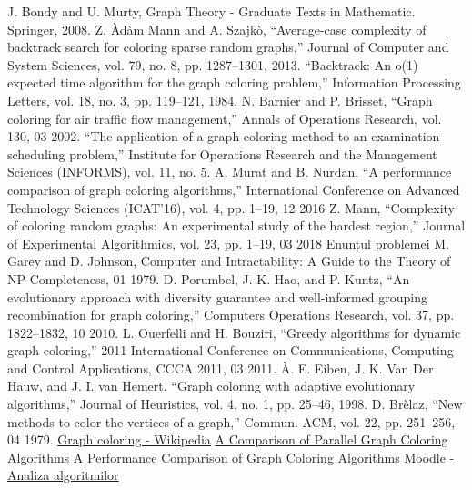 \documentclass[runningheads]{llncs}
\begin{document}
\begin{thebibliography}{8}
J. Bondy and U. Murty, Graph Theory - Graduate Texts in Mathematic.
Springer, 2008.
Z. \`{A}d\`{a}m Mann and A. Szajk\`{o}, “Average-case complexity of backtrack
search for coloring sparse random graphs,” Journal of Computer and
System Sciences, vol. 79, no. 8, pp. 1287–1301, 2013.
“Backtrack: An o(1) expected time algorithm for the graph coloring
problem,” Information Processing Letters, vol. 18, no. 3, pp. 119–121,
1984.
N. Barnier and P. Brisset, “Graph coloring for air traffic flow management,” 
Annals of Operations Research, vol. 130, 03 2002.
“The application of a graph coloring method to an examination scheduling problem,” 
Institute for Operations Research and the Management
Sciences (INFORMS), vol. 11, no. 5.
A. Murat and B. Nurdan, “A performance comparison of graph coloring algorithms,” 
International Conference on Advanced Technology
Sciences (ICAT’16), vol. 4, pp. 1–19, 12 2016
Z. Mann, “Complexity of coloring random graphs: An experimental
study of the hardest region,” Journal of Experimental Algorithmics,
vol. 23, pp. 1–19, 03 2018
\href{https://acs-aa-challenge.github.io/acs-aa-challenge/18-np-2-colouring/}{Enunțul problemei}
M. Garey and D. Johnson, Computer and Intractability: A Guide to the
Theory of NP-Completeness, 01 1979.
D. Porumbel, J.-K. Hao, and P. Kuntz, “An evolutionary approach with
diversity guarantee and well-informed grouping recombination for graph
coloring,” Computers Operations Research, vol. 37, pp. 1822–1832, 10
2010.
L. Ouerfelli and H. Bouziri, “Greedy algorithms for dynamic graph coloring,” 2011 International Conference on Communications, Computing
and Control Applications, CCCA 2011, 03 2011.
\`{A}. E. Eiben, J. K. Van Der Hauw, and J. I. van Hemert, “Graph coloring
with adaptive evolutionary algorithms,” Journal of Heuristics, vol. 4,
no. 1, pp. 25–46, 1998.
D. Br\`{e}laz, “New methods to color the vertices of a graph,”  Commun.
ACM, vol. 22, pp. 251–256, 04 1979.
\bibitem{}
\href{https://en.wikipedia.org/wiki/Graph_coloring}{Graph coloring - Wikipedia}
\bibitem{}
\href{https://citeseerx.ist.psu.edu/document?repid=rep1&type=pdf&doi=203a7b17267a28a06808bfb3b0b9571e32d15503}{A Comparison of Parallel Graph Coloring Algorithms}
\bibitem{}
\href{https://dergipark.org.tr/en/download/article-file/254140}{A Performance Comparison of Graph Coloring Algorithms}
\bibitem{}
\href{https://curs.upb.ro/2022/mod/folder/view.php?id=77105}{Moodle - Analiza algoritmilor}
% 
\end{thebibliography}
\end{document}
